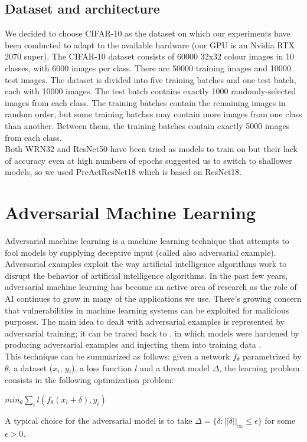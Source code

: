 \documentclass{article}
\begin{document}
\subsection{Dataset and architecture}

We decided to choose CIFAR-10 as the dataset on which our experiments have been conducted to adapt to the available hardware (our GPU is an Nvidia RTX 2070 super). The CIFAR-10 dataset consists of 60000 32x32 colour images in 10 classes, with 6000 images per class. There are 50000 training images and 10000 test images. The dataset is divided into five training batches and one test batch, each with 10000 images. The test batch contains exactly 1000 randomly-selected images from each class. The training batches contain the remaining images in random order, but some training batches may contain more images from one class than another. Between them, the training batches contain exactly 5000 images from each class.\\
Both WRN32  and ResNet50 have been tried as models to train on but their lack of accuracy even at high numbers of epochs suggested us to switch to shallower models, so we used PreActResNet18 which is based on ResNet18.


\section{Adversarial Machine Learning}
Adversarial machine learning is a machine learning technique that attempts to fool models by supplying deceptive input (called also adversarial example). Adversarial examples exploit the way artificial intelligence algorithms work to disrupt the behavior of artificial intelligence algorithms. In the past few years, adversarial machine learning has become an active area of research as the role of AI continues to grow in many of the applications we use. There’s growing concern that vulnerabilities in machine learning systems can be exploited for malicious purposes. The main idea to dealt with adversarial examples is represented by adversarial training; it can be traced back to \cite{GoodfellowEtAl2015}, in which models were hardened by producing adversarial examples and injecting them into training data \cite{ShafahiEtAl2019b}.\\
This technique can be summarized as follows: given a network $f_{\theta}$ parametrized by $\theta$, a dataset ($x_i$, $y_i$), a loss function $l$ and a threat model $\Delta$, the learning problem consists in the following optimization problem:
\begin{center}
	$min_{\theta}{\sum_{i}l(f_{\theta}(x_i + \delta), y_i)}$
\end{center}
A typical choice for the adversarial model is to take $\Delta = \{\delta : ||\delta||_{\infty} \le \epsilon\}$ for some $\epsilon > 0$.
\end{document}
